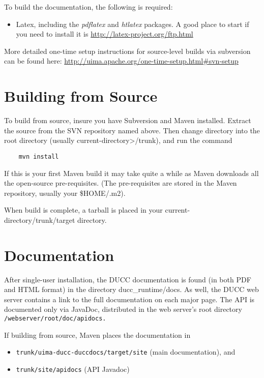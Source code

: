 To build the documentation, the following is required:
\begin{itemize}
  \item Latex, including the \emph{pdflatex} and \emph{htlatex} packages.  A good place
    to start if you need to install it is \url{http://latex-project.org/ftp.html}
\end{itemize}

More detailed one-time setup instructions for source-level builds via subversion can be found here:
\url{http://uima.apache.org/one-time-setup.html\#svn-setup}

\section{Building from Source}

To build from source, insure you have
Subversion and Maven installed.  Extract the source from the SVN repository named above. Then change directory into
the root directory (usually current-directory>/trunk), and run the command
\begin{verbatim}
    mvn install
\end{verbatim}

If this is your first Maven build it may take quite a while as Maven downloads all the
open-source pre-requisites.  (The pre-requisites are stored in the Maven repository, usually
your \$HOME/.m2).

When build is complete, a tarball is placed in your current-directory/trunk/target
directory.

\section{Documentation}
After single-user installation, the DUCC documentation is found (in both PDF and HTML format) in the directory 
ducc\_runtime/docs.  As well, the DUCC web server contains a link to the full documentation on each major page.
The API is documented only via JavaDoc, distributed in the web server's root directory 
{\tt \duccruntime/webserver/root/doc/apidocs.}  

If building from source, Maven places the documentation in
\begin{itemize}
    \item {\tt trunk/uima-ducc-duccdocs/target/site} (main documentation), and 
    \item {\tt trunk/site/apidocs} (API Javadoc)
\end{itemize}


